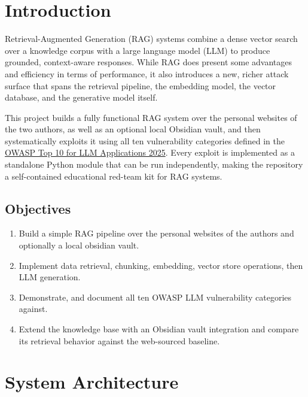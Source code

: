 \documentclass[12pt, a4paper]{report}
\begin{document}


\tableofcontents
\newpage

\chapter{Introduction}

Retrieval-Augmented Generation (RAG) systems combine a dense vector search over a knowledge corpus with a large language model (LLM) to produce grounded, context-aware responses.
While RAG does present some advantages and efficiency in terms of performance, it also introduces a new, richer attack surface that spans the retrieval pipeline, the embedding model, the vector database, and the generative model itself.

This project builds a fully functional RAG system over the personal websites of the two authors, as well as an optional local Obsidian vault, and then systematically exploits it using all ten vulnerability categories defined in the \href{https://owasp.org/www-project-top-10-for-large-language-model-applications/assets/PDF/OWASP-Top-10-for-LLMs-v2025.pdf}{OWASP Top 10 for LLM Applications 2025}.
Every exploit is implemented as a standalone Python module that can be run independently, making the repository a self-contained educational red-team kit for RAG systems.

\section{Objectives}

\begin{enumerate}
      \item Build a simple RAG pipeline over the personal websites of the authors and optionally a local obsidian vault.
      \item Implement data retrieval, chunking, embedding, vector store operations, then LLM generation.
      \item Demonstrate, and document all ten OWASP LLM vulnerability categories against.
      \item Extend the knowledge base with an Obsidian vault integration and compare its retrieval behavior against the web-sourced baseline.
\end{enumerate}

\chapter{System Architecture}
\end{document}
